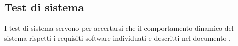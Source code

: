 		
	\subsection{Test di sistema}
	\label{testDiSistema}
		I test di sistema servono per accertarsi che il comportamento dinamico del sistema rispetti i requisiti software individuati e descritti nel documento \ARdoc.
